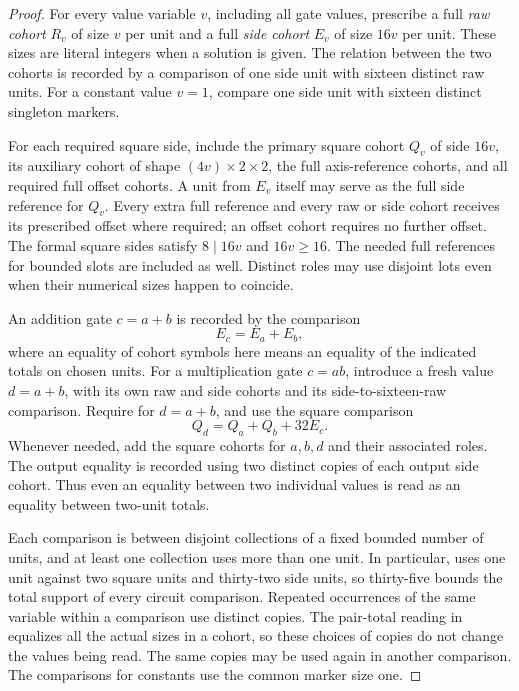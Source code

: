 \begin{proof}
For every value variable $v$, including all gate values, prescribe
a full \emph{raw cohort} $R_v$ of size $v$ per unit and a full
\emph{side cohort} $E_v$ of size $16v$ per unit.  These sizes are
literal integers when a solution is given.  The relation between
the two cohorts is recorded by a comparison of one side unit
with sixteen distinct raw units.  For a constant value $v=1$,
compare one side unit with sixteen distinct singleton markers.

For each required square side, include the primary square cohort
$Q_v$ of side $16v$, its auxiliary cohort of shape
$(4v)\times2\times2$, the full axis-reference cohorts, and all
required full offset cohorts.  A unit from $E_v$ itself may serve
as the full side reference for $Q_v$.  Every extra full reference
and every raw or side cohort receives its prescribed offset
where required; an offset cohort requires no further offset.
The formal square sides satisfy $8\mid16v$ and $16v\ge16$.
The needed full references for bounded slots are included as
well.  Distinct roles may use disjoint lots even when their
numerical sizes happen to coincide.

An addition gate $c=a+b$ is recorded by the comparison
\begin{equation}\label{n:add-comparison}
 E_c=E_a+E_b,
\end{equation}
where an equality of cohort symbols here means an equality of
the indicated totals on chosen units.  For a multiplication
gate $c=ab$, introduce a fresh value $d=a+b$, with its own raw
and side cohorts and its side-to-sixteen-raw comparison.
Require  for $d=a+b$, and use the
square comparison
\begin{equation}\label{n:product-comparison}
 Q_d=Q_a+Q_b+32E_c.
\end{equation}
Whenever needed, add the square cohorts for $a,b,d$ and their
associated roles.  The output equality is recorded using
two distinct copies of each output side cohort.  Thus even
an equality between two individual values is read as an
equality between two-unit totals.

Each comparison is between disjoint collections of a fixed
bounded number of units, and at least one collection uses
more than one unit.  In particular, 
uses one unit against two square units and thirty-two side
units, so thirty-five bounds the total support of every circuit
comparison.  Repeated occurrences of the same variable within
a comparison use distinct copies.  The pair-total reading
in  equalizes all the actual
sizes in a cohort, so these choices of copies do not change
the values being read.  The same copies may be used again
in another comparison.  The comparisons for constants
use the common marker size one.


\end{proof}
